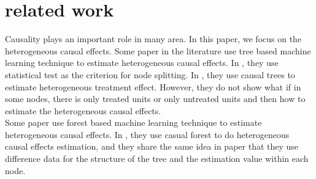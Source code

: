 \section{related work}
Causality \cite{Pearl:2000:CMR:331969} plays an important role in many area. In this paper, we focus on the heterogeneous causal effects.
Some paper in the literature use tree based machine learning technique to estimate heterogeneous causal effects.
In \cite{journals/jmlr/SuTWNL09}, they use statistical test as the criterion for node splitting.  In \cite{1504.01132}, they use causal trees to estimate heterogeneous treatment effect. However, they do not show what if in some nodes, there is only treated units or only untreated units and then how to estimate the heterogeneous causal effects.\\
Some paper use forest based machine learning technique to estimate heterogeneous causal effects. In \cite{1510.04342}, they use casual forest to do heterogeneous causal effects estimation, and they share the same idea in paper \cite{Denil:2014} that they use difference data for the structure of the tree and the estimation value within each node.